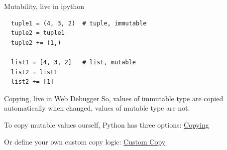 \documentclass[10pt, colorlinks=true, urlcolor=blue]{beamer}
\begin{document}
\begin{frame}[fragile]{Mutability, live in ipython}
  \vspace{-33.5mm}

  \begin{tcolorbox}[boxsep=0pt,left=2pt,right=2pt,top=2pt,bottom=2pt]
  \begin{verbatim}
  tuple1 = (4, 3, 2)  # tuple, immutable
  tuple2 = tuple1
  tuple2 += (1,)

  list1 = [4, 3, 2]   # list, mutable
  list2 = list1
  list2 += [1]
  \end{verbatim}
  \end{tcolorbox}

\end{frame}

\begin{frame}[fragile]{Copying, live in Web Debugger}
  So, values of immutable type are copied automatically when changed, values of mutable type are not.
  \vspace{2em}
  
  To copy mutable values ourself, Python has three options:
 \href{https://memory-graph.com/#code=import%20copy%0A%0Aa%20%3D%20%5B%20%5B1%2C%202%5D%2C%20%5B'x'%2C%20'y'%5D%20%5D%0A%0Ac1%20%3D%20a%20%20%20%20%20%20%20%20%20%20%20%20%20%20%20%20%0Ac2%20%3D%20copy.copy(a)%20%20%20%20%20%23%20or%3A%20%20a.copy()%20%20list(a)%20%20a%5B%3A%5D%0Ac3%20%3D%20copy.deepcopy(a)%20%0A%0A%23%20c1%3A%20assignment%2C%20%20%20nothing%20is%20copied%2C%20everything%20is%20shared%0A%23%20c2%3A%20shallow%20copy%2C%20first%20element%20is%20copied%2C%20underlying%20is%20shared%0A%23%20c3%3A%20deep%20copy%2C%20%20%20%20everything%20is%20copied%2C%20nothing%20is%20shared%0A}{Copying}
 \vspace{2em}

 Or define your own custom copy logic:
 \href{https://memory-graph.com/#code=import%20copy%0A%0Aa%20%3D%20%5B%20%5B1%2C%202%5D%2C%20%5B'x'%2C%20'y'%5D%20%5D%0A%0Ac1%20%3D%20a%20%20%20%20%20%20%20%20%20%20%20%20%20%20%20%20%0Ac2%20%3D%20copy.copy(a)%20%20%20%20%20%23%20or%3A%20%20a.copy()%20%20list(a)%20%20a%5B%3A%5D%0Ac3%20%3D%20copy.deepcopy(a)%20%0A%0A%23%20c1%3A%20assignment%2C%20%20%20nothing%20is%20copied%2C%20everything%20is%20shared%0A%23%20c2%3A%20shallow%20copy%2C%20first%20element%20is%20copied%2C%20underlying%20is%20shared%0A%23%20c3%3A%20deep%20copy%2C%20%20%20%20everything%20is%20copied%2C%20nothing%20is%20shared%0A%0Adef%20custom_copy(a)%3A%0A%20%20%20%20c%20%3D%20a.copy()%20%23%20shallow%20copy%0A%20%20%20%20c%5B1%5D%20%3D%20a%5B1%5D.copy()%0A%20%20%20%20return%20c%0A%20%20%20%20%0Ac4%20%3D%20custom_copy(a)%0A%0A%23%20c4%3A%20custom%20copy%2C%20%20%20you%20decide%20what%20is%20copied%20and%20shared%0A&breakpoints=18}{Custom Copy}
\end{frame}
\end{document}
